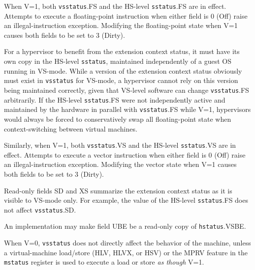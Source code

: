 When V=1, both {\tt vsstatus}.FS and the HS-level {\tt sstatus}.FS are in
effect.  Attempts
to execute a floating-point instruction when either field is 0 (Off) raise an
illegal-instruction exception.  Modifying the floating-point state when V=1
causes both fields to be set to 3 (Dirty).

\begin{commentary}
For a hypervisor to benefit from the extension context status, it must
have its own copy in the HS-level {\tt sstatus}, maintained independently
of a guest OS running in VS-mode.
While a version of the extension context status obviously must exist in
{\tt vsstatus} for VS-mode, a hypervisor cannot rely on this version
being maintained correctly, given that VS-level software can change
{\tt vsstatus}.FS arbitrarily.
If the HS-level {\tt sstatus}.FS were not independently active and
maintained by the hardware in parallel with {\tt vsstatus}.FS while V=1,
hypervisors would always be forced to conservatively swap all
floating-point state when context-switching between virtual machines.
\end{commentary}

Similarly, when V=1, both {\tt vsstatus}.VS and the HS-level {\tt sstatus}.VS
are in effect.
Attempts to execute a vector instruction when either field is 0 (Off) raise an
illegal-instruction exception.
Modifying the vector state when V=1 causes both fields to be set to 3 (Dirty).

Read-only fields SD and XS summarize the extension context status as it
is visible to VS-mode only.
For example, the value of the HS-level {\tt sstatus}.FS does not affect
{\tt vsstatus}.SD.

An implementation may make field UBE be a read-only copy of
{\tt hstatus}.VSBE.

When V=0, {\tt vsstatus} does not directly affect the behavior of the machine,
unless a virtual-machine load/store (HLV, HLVX, or HSV)
or the MPRV feature in the {\tt mstatus}
register is used to execute a load or store
{\em as though} V=1.




